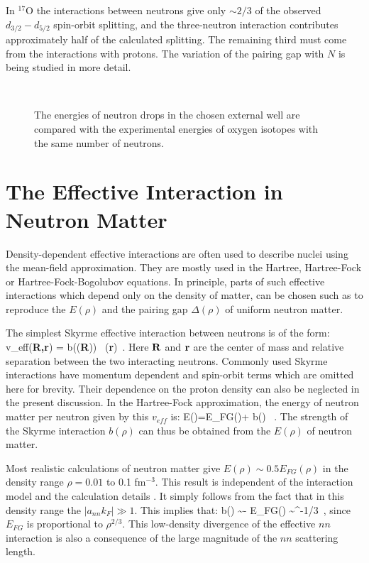 In $^{17}$O the interactions between neutrons give only $\sim 2/3$ of the 
observed 
$d_{3/2}-d_{5/2}$ spin-orbit splitting, and the three-neutron interaction 
contributes approximately half of the calculated splitting.  The remaining third must come from the 
interactions with protons.  The variation of the pairing gap with $N$ is 
being studied in more detail. 

\begin{figure}[t!]
\centerline
{\ }
\caption[fig]{ The energies of neutron drops in the chosen external well are 
compared with the experimental energies of oxygen isotopes with the 
same number of neutrons.}
\label{fig:oxydr}
\end{figure}

\section{The Effective Interaction in Neutron Matter}

Density-dependent effective interactions are often used to describe nuclei 
using the mean-field approximation.  They are mostly used in the Hartree, 
Hartree-Fock or Hartree-Fock-Bogolubov equations.  In principle, parts of 
such effective interactions which depend only on the density of matter, can 
be chosen such as to reproduce the $E(\rho)$ and the pairing gap $\Delta(\rho)$ 
of uniform neutron matter.  

The simplest Skyrme effective interaction between neutrons is of the form:
\beq
v_{eff}({\bf R,r}) = b(\rho({\bf R}))~ \delta({\bf r})~.
\eeq
Here ${\bf R}$ and ${\bf r}$ are the center of mass and relative separation 
between the two interacting neutrons.  Commonly used Skyrme interactions have 
momentum dependent and spin-orbit terms which are omitted here for brevity.  Their 
dependence on the proton density can also be neglected in the present 
discussion.  In the 
Hartree-Fock approximation, the energy of neutron matter per neutron 
given by this $v_{eff}$ is:
\beq
E(\rho)=E_{FG}(\rho)+  b(\rho) \rho~.
\eeq
The strength of the Skyrme interaction $b(\rho)$ can thus be obtained from the 
$E(\rho)$ of neutron matter. 

Most realistic calculations of neutron matter give $E(\rho) \sim 0.5 E_{FG}(\rho)$ 
in the density range $\rho=0.01$ to 0.1 fm$^{-3}$.  This result is independent of 
the interaction model and the calculation details \cite{anr1}.  It simply follows 
from the fact that in this density range the $|a_{nn}k_F| \gg 1$.  This implies that:
\beq
b(\rho) \sim -  E_{FG}(\rho) \sim \alpha \rho^{-1/3}~, 
\eeq
since $E_{FG}$ is proportional to $\rho^{2/3}$.  This low-density divergence of 
the effective $nn$ interaction is also a consequence of the large magnitude of the 
$nn$ scattering length. 

